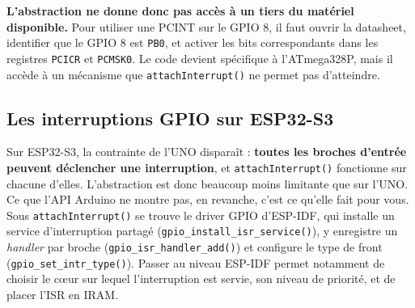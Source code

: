 \textbf{L'abstraction ne donne donc pas accès à un tiers du matériel disponible.} Pour utiliser une PCINT sur le GPIO 8, il faut ouvrir la datasheet, identifier que le GPIO 8 est \texttt{PB0}, et activer les bits correspondants dans les registres \texttt{PCICR} et \texttt{PCMSK0}. Le code devient spécifique à l'ATmega328P, mais il accède à un mécanisme que \texttt{attachInterrupt()} ne permet pas d'atteindre.


\subsection{Les interruptions GPIO sur ESP32-S3}

Sur ESP32-S3, la contrainte de l'UNO disparaît : \textbf{toutes les broches d'entrée peuvent déclencher une interruption}, et \texttt{attachInterrupt()} fonctionne sur chacune d'elles. L'abstraction est donc beaucoup moins limitante que sur l'UNO.\\

Ce que l'API Arduino ne montre pas, en revanche, c'est ce qu'elle fait pour vous. Sous \texttt{attachInterrupt()} se trouve le driver GPIO d'ESP-IDF, qui installe un service d'interruption partagé (\texttt{gpio\_install\_isr\_service()}), y enregistre un \textit{handler} par broche (\texttt{gpio\_isr\_handler\_add()}) et configure le type de front (\texttt{gpio\_set\_intr\_type()}). Passer au niveau ESP-IDF permet notamment de choisir le c\oe ur sur lequel l'interruption est servie, son niveau de priorité, et de placer l'ISR en IRAM.


